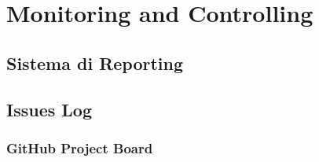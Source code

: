 \section{Monitoring and Controlling}

\subsection{Sistema di Reporting}

\subsection{Issues Log}

\subsubsection{GitHub Project Board}


